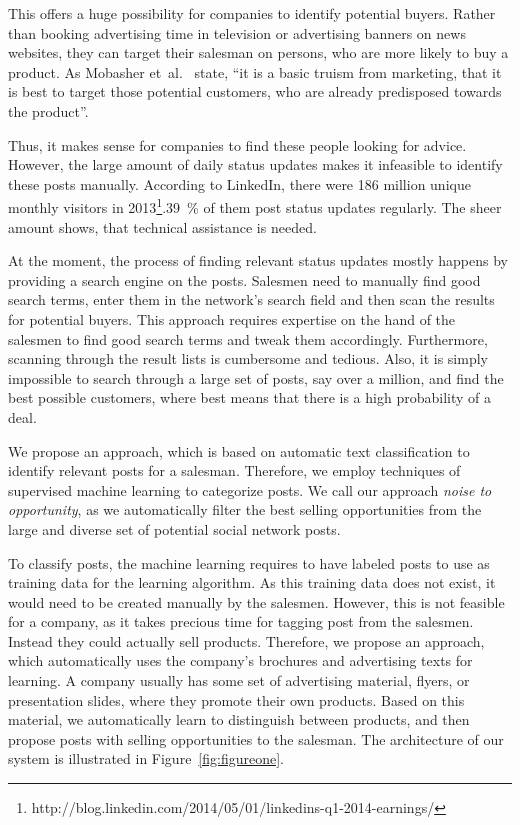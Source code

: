 This offers a huge possibility for companies to identify potential buyers.
Rather than booking advertising time in television or advertising banners on news websites, they can target their salesman on persons, who are more likely to buy a product.
As Mobasher et~al.~\cite{mobasher2007toward} state, ``it is a basic truism from marketing, that it is best to target those potential customers, who are already predisposed towards the product''.

Thus, it makes sense for companies to find these people looking for advice.
However, the large amount of daily status updates makes it infeasible to identify these posts manually.
According to LinkedIn, there were 186 million unique monthly visitors in 2013\footnote{http://blog.linkedin.com/2014/05/01/linkedins-q1-2014-earnings/}.39~\% of them post status updates regularly.
The sheer amount shows, that technical assistance is needed.

At the moment, the process of finding relevant status updates mostly happens by providing a search engine on the posts.
Salesmen need to manually find good search terms, enter them in the network's search field and then scan the results for potential buyers.
This approach requires expertise on the hand of the salesmen to find good search terms and tweak them accordingly.
Furthermore, scanning through the result lists is cumbersome and tedious.
Also, it is simply impossible to search through a large set of posts, say over a million, and find the best possible customers, where best means that there is a high probability of a deal.

We propose an approach, which is based on automatic text classification to identify relevant posts for a salesman.
Therefore, we employ techniques of supervised machine learning to categorize posts.
We call our approach \emph{noise to opportunity}, as we automatically filter the best selling opportunities from the large and diverse set of potential social network posts.

To classify posts, the machine learning requires to have labeled posts to use as training data for the learning algorithm.
As this training data does not exist, it would need to be created manually by the salesmen.
However, this is not feasible for a company, as it takes precious time for tagging post from the salesmen. Instead they could actually sell products.
Therefore, we propose an approach, which automatically uses the company's brochures and advertising texts for learning.
A company usually has some set of advertising material, flyers, or presentation slides, where they promote their own products.
Based on this material, we automatically learn to distinguish between products, and then propose posts with selling opportunities to the salesman.
The architecture of our system is illustrated in Figure~\ref{fig:figureone}.


